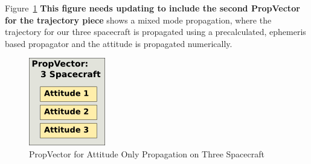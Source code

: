 Figure~\ref{figure:AttitudePropVector} \textbf{This figure needs updating to include the second
PropVector for the trajectory piece} shows a mixed mode propagation, where the trajectory for our
three spacecraft is propagated using a precalculated, ephemeris based propagator and the attitude is
propagated numerically.

\begin{figure}[htb]
\begin{center}
\includegraphics[63,73]{Images/ThreeSatAttitudePropVector.png}
\caption{\label{figure:AttitudePropVector}PropVector for Attitude Only Propagation on Three
Spacecraft}
\end{center}
\end{figure}





